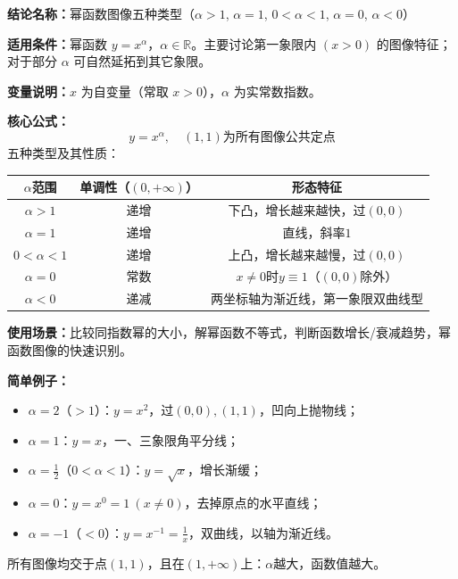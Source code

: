 \textbf{结论名称：}幂函数图像五种类型（$\alpha>1$, $\alpha=1$, $0<\alpha<1$, $\alpha=0$, $\alpha<0$）

\textbf{适用条件：}幂函数 $y=x^\alpha$，$\alpha\in\mathbb{R}$。主要讨论第一象限内 $(x>0)$ 的图像特征；对于部分 $\alpha$ 可自然延拓到其它象限。

\textbf{变量说明：}$x$ 为自变量（常取 $x>0$），$\alpha$ 为实常数指数。

\textbf{核心公式：}
\[
\boxed{y = x^\alpha,\quad (1,1)\text{为所有图像公共定点}}
\]
五种类型及其性质：
\begin{center}
\begin{tabular}{c|c|c}
$\alpha$范围 & 单调性（$(0,+\infty)$） & 形态特征 \\ \hline
$\alpha>1$ & 递增 & 下凸，增长越来越快，过$(0,0)$ \\
$\alpha=1$ & 递增 & 直线，斜率$1$ \\
$0<\alpha<1$ & 递增 & 上凸，增长越来越慢，过$(0,0)$ \\
$\alpha=0$ & 常数 & $x\neq0$时$y\equiv1$（$(0,0)$除外） \\
$\alpha<0$ & 递减 & 两坐标轴为渐近线，第一象限双曲线型
\end{tabular}
\end{center}

\textbf{使用场景：}比较同指数幂的大小，解幂函数不等式，判断函数增长/衰减趋势，幂函数图像的快速识别。

\textbf{简单例子：}
\begin{itemize}
\item $\alpha=2$（$>1$）：$y=x^2$，过$(0,0),(1,1)$，凹向上抛物线；
\item $\alpha=1$：$y=x$，一、三象限角平分线；
\item $\alpha=\frac12$（$0<\alpha<1$）：$y=\sqrt{x}$，增长渐缓；
\item $\alpha=0$：$y=x^0=1\ (x\neq0)$，去掉原点的水平直线；
\item $\alpha=-1$（$<0$）：$y=x^{-1}=\frac1x$，双曲线，以轴为渐近线。
\end{itemize}
所有图像均交于点$(1,1)$，且在$(1,+\infty)$上：$\alpha$越大，函数值越大。